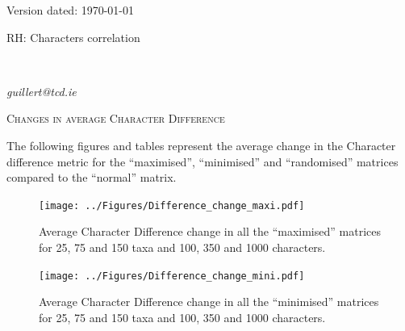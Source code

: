 \documentclass[12pt,letterpaper]{article}
\renewcommand{\section}[1]{%
\bigskip
\begin{center}
\begin{Large}
\normalfont\scshape #1
\medskip
\end{Large}
\end{center}}
\begin{document}
\begin{flushright}
Version dated: \today
\end{flushright}

\bigskip
\noindent RH: Characters correlation
\bigskip
\medskip
\begin{center}
\bigskip


\\

\end{center}
\medskip
{} \textit{guillert@tcd.ie}\\ 
\vspace{1in}


\newpage

\section{Changes in average Character Difference}

The following figures and tables represent the average change in the Character difference metric for the ``maximised'', ``minimised'' and ``randomised'' matrices compared to the ``normal'' matrix.

\begin{figure}[!htbp]
\centering
   \texttt{[image: ../Figures/Difference\_change\_maxi.pdf]}
\caption{Average Character Difference change in all the ``maximised'' matrices for 25, 75 and 150 taxa and 100, 350 and 1000 characters.}
\end{figure}

\begin{figure}[!htbp]
\centering
   \texttt{[image: ../Figures/Difference\_change\_mini.pdf]}
\caption{Average Character Difference change in all the ``minimised'' matrices for 25, 75 and 150 taxa and 100, 350 and 1000 characters.}
\end{figure}
\end{document}
